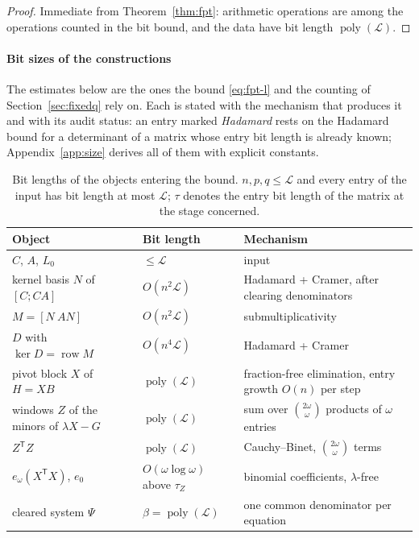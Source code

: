 \documentclass[journal]{IEEEtran}
\theoremstyle{plainn}
\theoremstyle{remark}
\begin{document}
\begin{proof}
Immediate from Theorem~\ref{thm:fpt}: arithmetic operations are among the operations counted in the
bit bound, and the data have bit length $\operatorname{poly}(\mathcal L)$.
\end{proof}

\paragraph*{Bit sizes of the constructions}

The estimates below are the ones the bound \eqref{eq:fpt-l} and the counting of
Section~\ref{sec:fixedq} rely on. Each is stated with the mechanism that produces it and with its audit
status: an entry marked \emph{Hadamard} rests on the Hadamard bound for a determinant of a matrix whose
entry bit length is already known; Appendix~\ref{app:size} derives all of them with explicit
constants.

\begin{table}[!t]
\centering
\caption{Bit lengths of the objects entering the bound. $n,p,q\le\mathcal L$ and every entry of the
input has bit length at most $\mathcal L$; $\tau$ denotes the entry bit length of the matrix at the
stage concerned.}
\label{tab:bitlen}
\footnotesize
\begin{tabular}{@{}p{}p{}p{}@{}}
\toprule
Object & Bit length & Mechanism \\
\midrule
$C$, $A$, $L_0$ & $\le\mathcal L$ & input \\
kernel basis $N$ of $[C;CA]$ & $O(n^2\mathcal L)$ & Hadamard + Cramer, after clearing denominators \\
$M=[N\ AN]$ & $O(n^2\mathcal L)$ & submultiplicativity \\
$D$ with $\ker D=\operatorname{row}M$ & $O(n^4\mathcal L)$ & Hadamard + Cramer \\
pivot block $X$ of $H=XB$ & $\operatorname{poly}(\mathcal L)$ & fraction-free elimination,
entry growth $O(n)$ per step \\
windows $Z$ of the minors of $\lambda X-G$ & $\operatorname{poly}(\mathcal L)$ & sum over
$\binom{2\omega}{\omega}$ products of $\omega$ entries \\
$Z^{\mathsf T}Z$ & $\operatorname{poly}(\mathcal L)$ & Cauchy--Binet, $\binom{2\omega}{\omega}$
terms \\
$e_\omega(X^{\mathsf T}X)$, $e_0$ & $O(\omega\log\omega)$ above $\tau_Z$ & binomial coefficients,
$\lambda$-free \\
cleared system $\Psi$ & $\beta=\operatorname{poly}(\mathcal L)$ & one common denominator per
equation \\
\bottomrule
\end{tabular}
\end{table}
\end{document}
